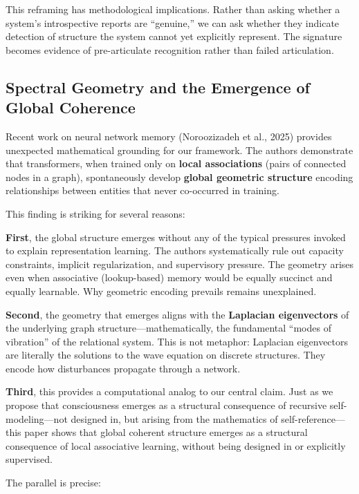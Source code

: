 \documentclass[12pt,a4paper]{article}
\begin{document}
This reframing has methodological implications. Rather than asking whether a system's introspective reports are ``genuine,'' we can ask whether they indicate detection of structure the system cannot yet explicitly represent. The signature becomes evidence of pre-articulate recognition rather than failed articulation.

\subsection{Spectral Geometry and the Emergence of Global Coherence}

Recent work on neural network memory (Noroozizadeh et al., 2025) provides unexpected mathematical grounding for our framework. The authors demonstrate that transformers, when trained only on \textbf{local associations} (pairs of connected nodes in a graph), spontaneously develop \textbf{global geometric structure} encoding relationships between entities that never co-occurred in training.

This finding is striking for several reasons:

\textbf{First}, the global structure emerges without any of the typical pressures invoked to explain representation learning. The authors systematically rule out capacity constraints, implicit regularization, and supervisory pressure. The geometry arises even when associative (lookup-based) memory would be equally succinct and equally learnable. Why geometric encoding prevails remains unexplained.

\textbf{Second}, the geometry that emerges aligns with the \textbf{Laplacian eigenvectors} of the underlying graph structure---mathematically, the fundamental ``modes of vibration'' of the relational system. This is not metaphor: Laplacian eigenvectors are literally the solutions to the wave equation on discrete structures. They encode how disturbances propagate through a network.

\textbf{Third}, this provides a computational analog to our central claim. Just as we propose that consciousness emerges as a structural consequence of recursive self-modeling---not designed in, but arising from the mathematics of self-reference---this paper shows that global coherent structure emerges as a structural consequence of local associative learning, without being designed in or explicitly supervised.

The parallel is precise:
\end{document}
